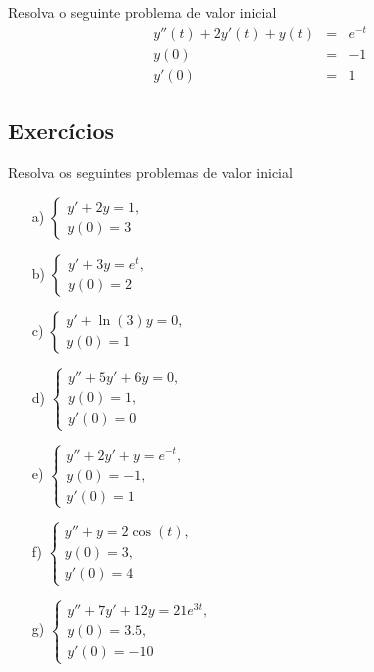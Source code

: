 \begin{exer}Resolva o seguinte problema de valor inicial
\begin{eqnarray*}
 y''(t)+2y'(t)+y(t)&=&e^{-t}\\
y(0)&=&-1\\
y'(0)&=&1
\end{eqnarray*}
\end{exer}

\subsection*{Exercícios}
\begin{exer} Resolva os seguintes problemas de valor inicial
 \begin{itemize}
  \item[a)] $\displaystyle \left\{\begin{array}{l}y'+2y=1,\\ y(0)=3 \end{array}\right.$
    \item[b)] $\displaystyle \left\{\begin{array}{l}y'+3y=e^t,\\ y(0)=2 \end{array}\right.$
    \item[c)] $\displaystyle \left\{\begin{array}{l}y'+\ln(3)y=0,\\ y(0)=1 \end{array}\right.$ 
    \item[d)] $\displaystyle \left\{\begin{array}{l}y''+5y'+6y=0,\\ y(0)=1,\\ y'(0)=0 \end{array}\right.$
    \item[e)] $\displaystyle \left\{\begin{array}{l}y''+2y'+y=e^{-t},\\ y(0)=-1,\\ y'(0)=1 \end{array}\right.$
    \item[f)] $\displaystyle \left\{\begin{array}{l}y'' +  y = 2 \cos(t),\\ y(0)=3,\\ y'(0)=4 \end{array}\right.$
    \item[g)] $\displaystyle \left\{\begin{array}{l}y'' +7 y' +12 y = 21 e^{3t},\\ y(0)=3.5, \\ y'(0)=-10 \end{array}\right.$
 \end{itemize}
\end{exer}
